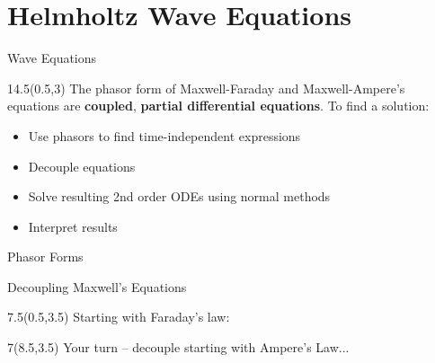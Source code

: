 \section{Helmholtz Wave Equations}
\begin{frame}{Wave Equations}
\begin{textblock}{14.5}(0.5,3)
The phasor form of Maxwell-Faraday and Maxwell-Ampere's equations are \textbf{coupled}, \textbf{partial differential equations}. To find a solution:
\begin{itemize}
	\item Use phasors to find time-independent expressions
	\item Decouple equations 
	\item Solve resulting 2nd order ODEs using normal methods
	\item Interpret results
\end{itemize}

\begin{myblock}[0.9]{Phasor Forms}
\end{myblock}
\end{textblock}

\end{frame}


\begin{frame}{Decoupling Maxwell's Equations}
\begin{textblock}{7.5}(0.5,3.5)
Starting with Faraday's law:
\begin{small}
\end{small}
\end{textblock}

\begin{textblock}{7}(8.5,3.5)
Your turn -- decouple starting with Ampere's Law...


\end{textblock}

\end{frame}

